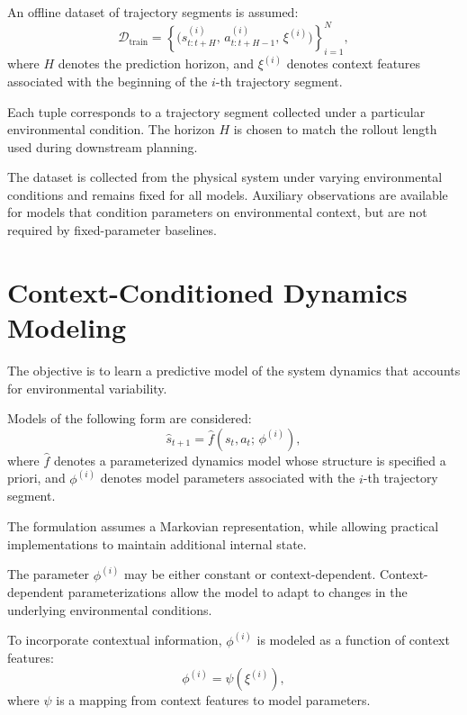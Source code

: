 An offline dataset of trajectory segments is assumed:
\begin{equation}
  \mathcal{D}_{\text{train}} =
  \left\{
  \big(s_{t:t+H}^{(i)},\, a_{t:t+H-1}^{(i)},\, \xi^{(i)}\big)
  \right\}_{i=1}^{N},
\end{equation}
where $H$ denotes the prediction horizon, and $\xi^{(i)}$ denotes context features associated with the beginning of the $i$-th trajectory segment.

Each tuple corresponds to a trajectory segment collected under a particular environmental condition. The horizon $H$ is chosen to match the rollout length used during downstream planning.

The dataset is collected from the physical system under varying environmental conditions and remains fixed for all models. Auxiliary observations are available for models that condition parameters on environmental context, but are not required by fixed-parameter baselines.

\section{Context-Conditioned Dynamics Modeling}

The objective is to learn a predictive model of the system dynamics that accounts for environmental variability.

Models of the following form are considered:
\begin{equation}
  \hat{s}_{t+1} = \hat{f}(s_t, a_t;\, \phi^{(i)}),
  \label{eq:learned-model}
\end{equation}
where $\hat{f}$ denotes a parameterized dynamics model whose structure is specified a priori, and $\phi^{(i)}$ denotes model parameters associated with the $i$-th trajectory segment.

The formulation assumes a Markovian representation, while allowing practical implementations to maintain additional internal state.

The parameter $\phi^{(i)}$ may be either constant or context-dependent. Context-dependent parameterizations allow the model to adapt to changes in the underlying environmental conditions.

To incorporate contextual information, $\phi^{(i)}$ is modeled as a function of context features:
\begin{equation}
  \phi^{(i)} = \psi(\xi^{(i)}),
\end{equation}
where $\psi$ is a mapping from context features to model parameters.

